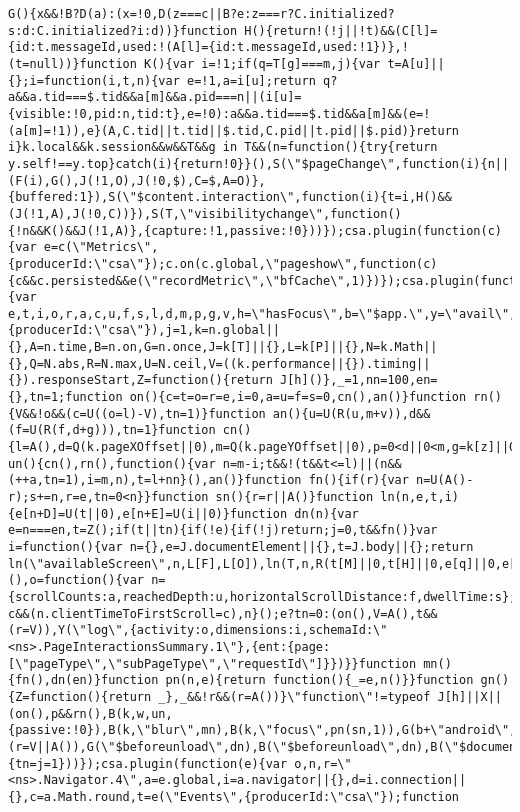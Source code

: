 \documentclass[
]{article}
\begin{document}
\begin{verbatim}
G(){x&&!B?D(a):(x=!0,D(z===c||B?e:z===r?C.initialized?s:d:C.initialized?i:d))}function H(){return!(!j||!t)&&(C[l]={id:t.messageId,used:!(A[l]={id:t.messageId,used:!1})},!(t=null))}function K(){var i=!1;if(q=T[g]===m,j){var t=A[u]||{};i=function(i,t,n){var e=!1,a=i[u];return q?a&&a.tid===$.tid&&a[m]&&a.pid===n||(i[u]={visible:!0,pid:n,tid:t},e=!0):a&&a.tid===$.tid&&a[m]&&(e=!(a[m]=!1)),e}(A,C.tid||t.tid||$.tid,C.pid||t.pid||$.pid)}return i}k.local&&k.session&&w&&T&&g in T&&(n=function(){try{return y.self!==y.top}catch(i){return!0}}(),S(\"$pageChange\",function(i){n||(F(i),G(),J(!1,O),J(!0,$),C=$,A=O)},{buffered:1}),S(\"$content.interaction\",function(i){t=i,H()&&(J(!1,A),J(!0,C))}),S(T,\"visibilitychange\",function(){!n&&K()&&J(!1,A)},{capture:!1,passive:!0}))});csa.plugin(function(c){var e=c(\"Metrics\",{producerId:\"csa\"});c.on(c.global,\"pageshow\",function(c){c&&c.persisted&&e(\"recordMetric\",\"bfCache\",1)})});csa.plugin(function(n){var e,t,i,o,r,a,c,u,f,s,l,d,m,p,g,v,h=\"hasFocus\",b=\"$app.\",y=\"avail\",S=\"client\",T=\"document\",$=\"inner\",I=\"offset\",P=\"screen\",w=\"scroll\",D=\"Width\",E=\"Height\",F=y+D,O=y+E,q=S+D,x=S+E,z=$+D,C=$+E,H=I+D,K=I+E,M=w+D,W=w+E,X=n.config[\"KillSwitch.PageInteractionsSummary\"],Y=n(\"Events\",{producerId:\"csa\"}),j=1,k=n.global||{},A=n.time,B=n.on,G=n.once,J=k[T]||{},L=k[P]||{},N=k.Math||{},Q=N.abs,R=N.max,U=N.ceil,V=((k.performance||{}).timing||{}).responseStart,Z=function(){return J[h]()},_=1,nn=100,en={},tn=1;function on(){c=t=o=r=e,i=0,a=u=f=s=0,cn(),an()}function rn(){V&&!o&&(c=U((o=l)-V),tn=1)}function an(){u=U(R(u,m+v)),d&&(f=U(R(f,d+g))),tn=1}function cn(){l=A(),d=Q(k.pageXOffset||0),m=Q(k.pageYOffset||0),p=0<d||0<m,g=k[z]||0,v=k[C]||0}function un(){cn(),rn(),function(){var n=m-i;t&&!(t&&t<=l)||(n&&(++a,tn=1),i=m,n),t=l+nn}(),an()}function fn(){if(r){var n=U(A()-r);s+=n,r=e,tn=0<n}}function sn(){r=r||A()}function ln(n,e,t,i){e[n+D]=U(t||0),e[n+E]=U(i||0)}function dn(n){var e=n===en,t=Z();if(t||tn){if(!e){if(!j)return;j=0,t&&fn()}var i=function(){var n={},e=J.documentElement||{},t=J.body||{};return ln(\"availableScreen\",n,L[F],L[O]),ln(T,n,R(t[M]||0,t[H]||0,e[q]||0,e[M]||0,e[H]||0),R(t[W]||0,t[K]||0,e[x]||0,e[W]||0,e[K]||0)),ln(P,n,L.width,L.height),ln(\"viewport\",n,k[z],k[C]),n}(),o=function(){var n={scrollCounts:a,reachedDepth:u,horizontalScrollDistance:f,dwellTime:s};return\"number\"==typeof c&&(n.clientTimeToFirstScroll=c),n}();e?tn=0:(on(),V=A(),t&&(r=V)),Y(\"log\",{activity:o,dimensions:i,schemaId:\"<ns>.PageInteractionsSummary.1\"},{ent:{page:[\"pageType\",\"subPageType\",\"requestId\"]}})}}function mn(){fn(),dn(en)}function pn(n,e){return function(){_=e,n()}}function gn(){Z=function(){return _},_&&!r&&(r=A())}\"function\"!=typeof J[h]||X||(on(),p&&rn(),B(k,w,un,{passive:!0}),B(k,\"blur\",mn),B(k,\"focus\",pn(sn,1)),G(b+\"android\",gn),G(b+\"ios\",gn),B(b+\"pause\",pn(mn,0)),B(b+\"resume\",pn(sn,1)),B(b+\"resign\",pn(mn,0)),B(b+\"active\",pn(sn,1)),Z()&&(r=V||A()),G(\"$beforeunload\",dn),B(\"$beforeunload\",dn),B(\"$document.hidden\",mn),B(\"$beforePageTransition\",dn),B(\"$afterPageTransition\",function(){tn=j=1}))});csa.plugin(function(e){var o,n,r=\"<ns>.Navigator.4\",a=e.global,i=a.navigator||{},d=i.connection||{},c=a.Math.round,t=e(\"Events\",{producerId:\"csa\"});function 
\end{verbatim}
\end{document}
